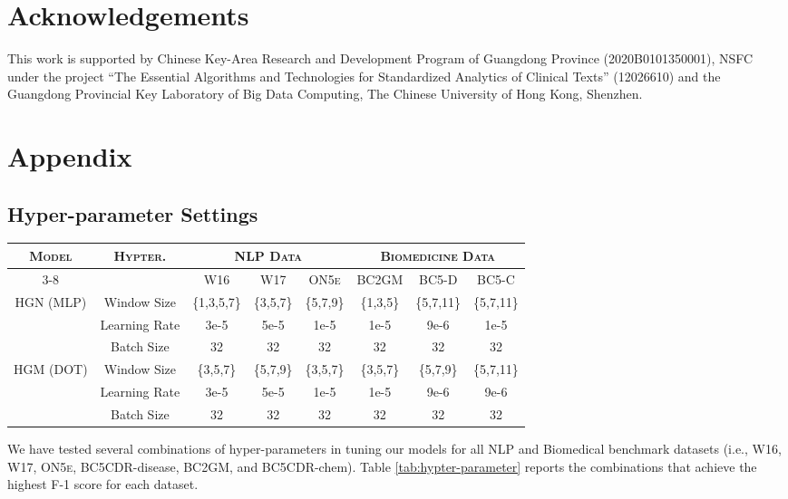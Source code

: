 \documentclass[11pt]{article}
\begin{document}
\section*{Acknowledgements}
This work is supported by Chinese Key-Area Research and Development Program of Guangdong Province (2020B0101350001), NSFC under the project “The Essential Algorithms and Technologies for Standardized Analytics of Clinical Texts” (12026610) and the Guangdong Provincial Key Laboratory of Big Data Computing, The Chinese University of Hong Kong, Shenzhen.






\clearpage
\appendix
\section{Appendix}
\label{sec:appendix}



\subsection{Hyper-parameter Settings}
\label{appendix:hyperparameter}
\begin{table*}[t]
\centering
\vspace{1mm}
\begin{tabular}{c|c|c|c|c|c|c|c}
\toprule
\multirow{2}{*}{\textsc{\textbf{Model}}} & \multirow{2}{*}{\textsc{\textbf{Hypter.}}} & \multicolumn{3}{c|}{\textsc{\textbf{NLP Data}}} & \multicolumn{3}{c}{\textsc{\textbf{Biomedicine Data}}} \\ \cmidrule(l){3-8} 
 &  & \textsc{W16} & \textsc{W17} & \textsc{ON5e} & \textsc{BC2GM} & \textsc{BC5-D} & \textsc{BC5-C} \\ \midrule
\multirow{3}{*}{\textsc{HGN (MLP)}} & Window Size &\{1,3,5,7\} &  \{3,5,7\}
&  \{5,7,9\}
&  \{1,3,5\}
&  \{5,7,11\}
&  \{5,7,11\}
\\
 & Learning Rate & 3e-5 & 5e-5 & 1e-5 & 1e-5 & 9e-6 &1e-5  \\
 & Batch Size & 32  & 32 & 32 & 32 & 32 &32  \\ \midrule
\multirow{3}{*}{\textsc{HGM (DOT)}} & Window Size & \{3,5,7\} & \{5,7,9\}
&  \{3,5,7\}
&  \{3,5,7\}
&  \{5,7,9\}
&  \{5,7,11\}
\\
 & Learning Rate &3e-5  &5e-5  & 1e-5 & 1e-5 &9e-6  &9e-6  \\
 & Batch Size & 32  & 32 & 32 & 32 & 32 &32  \\ \bottomrule
\end{tabular}
\caption{The hyper-parameters for best models that we have experimented on the given datasets.}
\label{tab:hypter-parameter}
\end{table*}
We have tested several combinations of hyper-parameters in tuning our models for all NLP and Biomedical benchmark datasets (i.e., W16, W17, \textsc{ON5e}, BC5CDR-disease, BC2GM, and BC5CDR-chem). Table \ref{tab:hypter-parameter} reports the combinations that achieve the highest F-1 score for each dataset.

 
\end{document}
